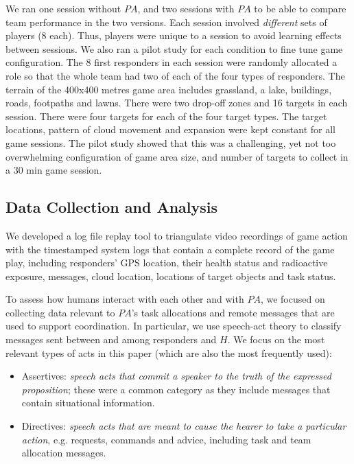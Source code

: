 We ran one session without $PA$, and two sessions with $PA$ to be able to compare team performance in the two versions. Each session involved \emph{different} sets of players (8 each). Thus,  players were unique to a session to avoid learning effects between sessions. We also ran a pilot study for each condition to fine tune game configuration. The 8 first responders in each session were randomly allocated a role so that the whole team had two of each of the four types of responders. The terrain of the 400x400 metres  game area includes grassland, a lake, buildings, roads,  footpaths and lawns. There were two  drop-off zones and 16 targets in each session. There were four targets for each of the four target types. The target locations, pattern of cloud movement and expansion were kept constant for all game sessions. The pilot study showed that this was a challenging, yet not too overwhelming configuration of game area size, and number of targets to collect in a 30 min game session. 

\subsection{Data Collection and Analysis}
\noindent 
We developed a log file replay tool to triangulate video recordings of game action with the timestamped system logs that contain a complete record of the game play, including responders' GPS location, their health status and radioactive exposure, messages, cloud location, locations of target objects and task status.

To assess how humans interact with each other and with $PA$, we focused on collecting data relevant to $PA$'s task allocations and remote messages  that are used to support coordination. In particular, we use speech-act theory \cite{searle:1975} to classify messages sent between and among responders and $H$. We focus on the most relevant types of acts in this paper (which are also the most frequently used):
\begin{itemize}
\item Assertives: \textit{speech acts that commit a speaker to the truth of the expressed proposition}; these were a common category as they include messages that contain situational information.
\item Directives: \textit{speech acts that are meant to cause the hearer to take a particular action}, e.g. requests, commands and advice, including task and team allocation messages. 
\end{itemize}

